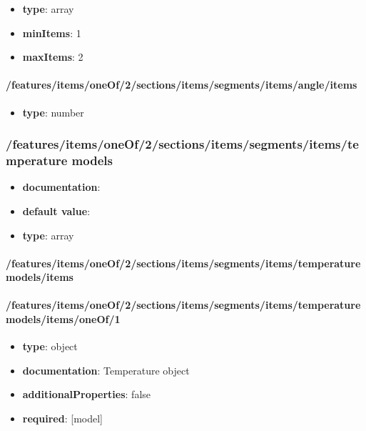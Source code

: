 \begin{itemize}\item {\bf type}: array
\item {\bf minItems}: 1
\item {\bf maxItems}: 2
\end{itemize}\paragraph{/features/items/oneOf/2/sections/items/segments/items/angle/items}
\begin{itemize}\item {\bf type}: number
\end{itemize}\subsubsection{/features/items/oneOf/2/sections/items/segments/items/temperature models}
\begin{itemize}\item {\bf documentation}: 
\item {\bf default value}: 
\item {\bf type}: array
\end{itemize}\paragraph{/features/items/oneOf/2/sections/items/segments/items/temperature models/items}

\paragraph{/features/items/oneOf/2/sections/items/segments/items/temperature models/items/oneOf/1}
\begin{itemize}\item {\bf type}: object
\item {\bf documentation}: Temperature object
\item {\bf additionalProperties}: false
\item {\bf required}: [model]\end{itemize}
